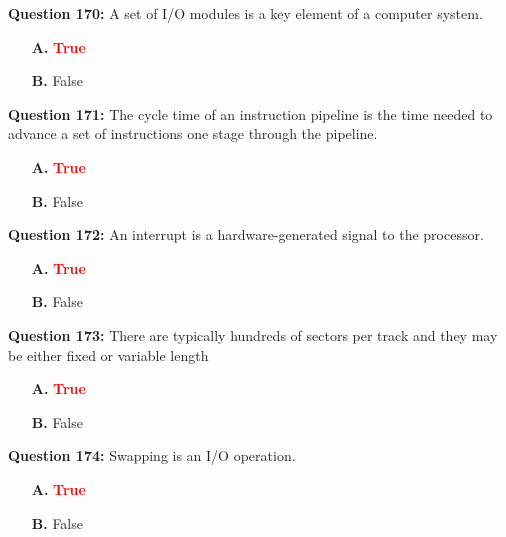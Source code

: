 \documentclass[12pt,a4paper]{article}
\begin{document}
\vspace{0.5cm}

\textbf{Question 170:} A set of I/O modules is a key element of a computer system.

\begin{itemize}
    \item[\textbf{A.}] \textcolor{red}{\textbf{True}}
    \item[\textbf{B.}] False
\end{itemize}

\vspace{0.5cm}

\textbf{Question 171:} The cycle time of an instruction pipeline is the time needed to advance a set of instructions one stage through the pipeline.

\begin{itemize}
    \item[\textbf{A.}] \textcolor{red}{\textbf{True}}
    \item[\textbf{B.}] False
\end{itemize}

\vspace{0.5cm}

\textbf{Question 172:} An interrupt is a hardware-generated signal to the processor.

\begin{itemize}
    \item[\textbf{A.}] \textcolor{red}{\textbf{True}}
    \item[\textbf{B.}] False
\end{itemize}

\vspace{0.5cm}

\textbf{Question 173:} There are typically hundreds of sectors per track and they may be either fixed or variable length

\begin{itemize}
    \item[\textbf{A.}] \textcolor{red}{\textbf{True}}
    \item[\textbf{B.}] False
\end{itemize}

\vspace{0.5cm}

\textbf{Question 174:} Swapping is an I/O operation.

\begin{itemize}
    \item[\textbf{A.}] \textcolor{red}{\textbf{True}}
    \item[\textbf{B.}] False
\end{itemize}
\end{document}
